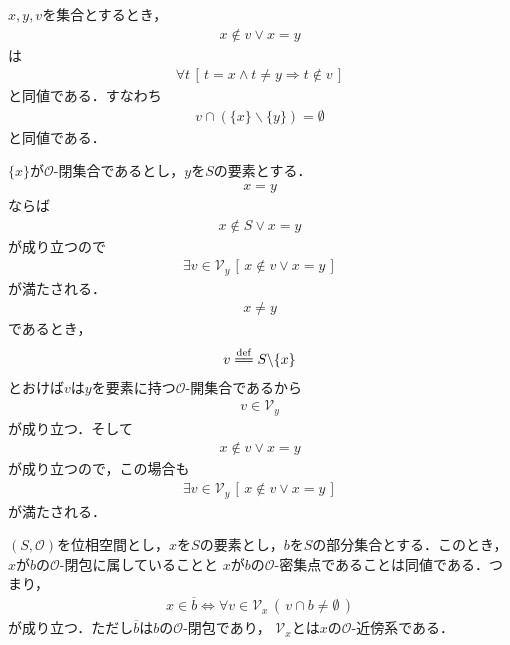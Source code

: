 	$x,y,v$を集合とするとき，
	\begin{align}
		x \notin v \vee x = y
	\end{align}
	は
	\begin{align}
		\forall t\, \left[\, t = x \wedge t \neq y \Longrightarrow t \notin v\, \right]
	\end{align}
	と同値である．すなわち
	\begin{align}
		v \cap (\{x\} \backslash \{y\}) = \emptyset
	\end{align}
	と同値である．
	
	\begin{sketch}
		$\{x\}$が$\mathscr{O}$-閉集合であるとし，$y$を$S$の要素とする．
		\begin{align}
			x = y
		\end{align}
		ならば
		\begin{align}
			x \notin S \vee x = y
		\end{align}
		が成り立つので
		\begin{align}
			\exists v \in \mathcal{V}_{y}\, \left[\, x \notin v \vee x = y\, \right]
		\end{align}
		が満たされる．
		\begin{align}
			x \neq y
		\end{align}
		であるとき，
		\begin{align}
			v \defeq S \backslash \{x\}
		\end{align}
		とおけば$v$は$y$を要素に持つ$\mathscr{O}$-開集合であるから
		\begin{align}
			v \in \mathcal{V}_{y}
		\end{align}
		が成り立つ．そして
		\begin{align}
			x \notin v \vee x = y
		\end{align}
		が成り立つので，この場合も
		\begin{align}
			\exists v \in \mathcal{V}_{y}\, \left[\, x \notin v \vee x = y\, \right]
		\end{align}
		が満たされる．
		\QED
	\end{sketch}
	
	\begin{screen}
		\begin{thm}[閉集合は密集点集合]
		\label{thm:belongs_to_closure_iff_clusters}
			$(S,\mathscr{O})$を位相空間とし，$x$を$S$の要素とし，$b$を$S$の部分集合とする．このとき，
			$x$が$b$の$\mathscr{O}$-閉包に属していることと
			$x$が$b$の$\mathscr{O}$-密集点であることは同値である．つまり，
			\begin{align}
				x \in \overline{b} \Longleftrightarrow
				\forall v \in \mathcal{V}_{x}\, (\, v \cap b \neq \emptyset\, )
				\label{thm_belongs_to_closure_iff_clusters}
			\end{align}
			が成り立つ．ただし$\overline{b}$は$b$の$\mathscr{O}$-閉包であり，
			$\mathcal{V}_{x}$とは$x$の$\mathscr{O}$-近傍系である．
		\end{thm}
	\end{screen}
	
